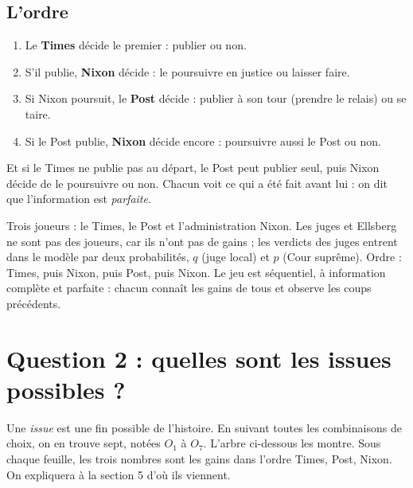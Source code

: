 \documentclass[11pt,a4paper]{article}
\theoremstyle{definition}
\begin{document}
\subsection{L'ordre}
\begin{enumerate}[leftmargin=*,itemsep=1pt]
\item Le \textbf{Times} décide le premier : publier ou non.
\item S'il publie, \textbf{Nixon} décide : le poursuivre en justice ou laisser faire.
\item Si Nixon poursuit, le \textbf{Post} décide : publier à son tour (prendre le relais) ou se taire.
\item Si le Post publie, \textbf{Nixon} décide encore : poursuivre aussi le Post ou non.
\end{enumerate}
Et si le Times ne publie pas au départ, le Post peut publier seul, puis Nixon décide de le poursuivre ou non. Chacun voit ce qui a été fait avant lui : on dit que l'information est \emph{parfaite}.

\begin{reponse}
Trois joueurs : le Times, le Post et l'administration Nixon. Les juges et Ellsberg ne sont pas des joueurs, car ils n'ont pas de gains ; les verdicts des juges entrent dans le modèle par deux probabilités, $q$ (juge local) et $p$ (Cour suprême). Ordre : Times, puis Nixon, puis Post, puis Nixon. Le jeu est séquentiel, à information complète et parfaite : chacun connaît les gains de tous et observe les coups précédents.
\end{reponse}

\section{Question 2 : quelles sont les issues possibles ?}

Une \emph{issue} est une fin possible de l'histoire. En suivant toutes les combinaisons de choix, on en trouve sept, notées $O_1$ à $O_7$. L'arbre ci-dessous les montre. Sous chaque feuille, les trois nombres sont les gains dans l'ordre Times, Post, Nixon. On expliquera à la section 5 d'où ils viennent.
\end{document}
